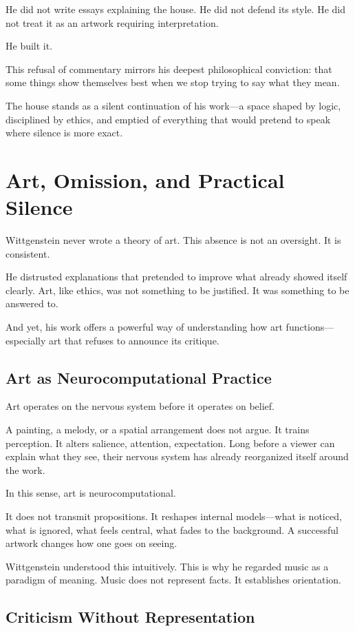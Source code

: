 \documentclass[11pt]{article}
\begin{document}
He did not write essays explaining the house. He did not defend its style. He did not treat it as an artwork requiring interpretation.

He built it.

This refusal of commentary mirrors his deepest philosophical conviction: that some things show themselves best when we stop trying to say what they mean.

The house stands as a silent continuation of his work—a space shaped by logic, disciplined by ethics, and emptied of everything that would pretend to speak where silence is more exact.

\section*{Art, Omission, and Practical Silence}

Wittgenstein never wrote a theory of art. This absence is not an oversight. It is consistent.

He distrusted explanations that pretended to improve what already showed itself clearly. Art, like ethics, was not something to be justified. It was something to be answered to.

And yet, his work offers a powerful way of understanding how art functions—especially art that refuses to announce its critique.

\subsection*{Art as Neurocomputational Practice}

Art operates on the nervous system before it operates on belief.

A painting, a melody, or a spatial arrangement does not argue. It trains perception. It alters salience, attention, expectation. Long before a viewer can explain what they see, their nervous system has already reorganized itself around the work.

In this sense, art is neurocomputational.

It does not transmit propositions. It reshapes internal models—what is noticed, what is ignored, what feels central, what fades to the background. A successful artwork changes how one goes on seeing.

Wittgenstein understood this intuitively. This is why he regarded music as a paradigm of meaning. Music does not represent facts. It establishes orientation.

\subsection*{Criticism Without Representation}
\end{document}
